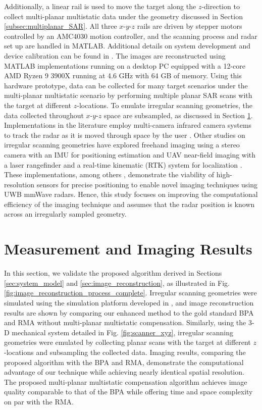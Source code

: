 \documentclass{ieeeaccess}
\begin{document}
Additionally, a linear rail is used to move the target along the $z$-direction to collect multi-planar multistatic data under the geometry discussed in Section \ref{subsec:multiplanar_SAR}.
All three $x$-$y$-$z$ rails are driven by stepper motors controlled by an AMC4030 motion controller, and the scanning process and radar set up are handled in MATLAB.
Additional details on system development and device calibration can be found in \cite{yanik2020development}.
The images are reconstructed using MATLAB implementations running on a desktop PC equipped with a 12-core AMD Ryzen 9 3900X running at 4.6 GHz with 64 GB of memory.
Using this hardware prototype, data can be collected for many target scenarios under the multi-planar multistatic scenario by performing multiple planar SAR scans with the target at different $z$-locations.
To emulate irregular scanning geometries, the data collected throughout $x$-$y$-$z$ space are subsampled, as discussed in Section \ref{sec:results}.
Implementations in the literature employ multi-camera infrared camera systems to track the radar as it is moved through space by the user \cite{alvarez2019freehand,alvarez2021freehand}.
Other studies on irregular scanning geometries have explored freehand imaging using a stereo camera with an IMU for positioning estimation \cite{alvarez2021towards} and UAV near-field imaging with a laser rangefinder and a real-time kinematic (RTK) system for localization \cite{garcia20203DSARProcessing}. 
These implementations, among others \cite{alvarez2021freehandsystem,alvarez2021system,wu2020multilayered,kan2020automotiveSAR}, demonstrate the viability of high-resolution sensors for precise positioning to enable novel imaging techniques using UWB mmWave radars.
Hence, this study focuses on improving the computational efficiency of the imaging technique and assumes that the radar position is known across an irregularly sampled geometry.

\section{Measurement and Imaging Results}
\label{sec:results}
In this section, we validate the proposed algorithm derived in Sections \ref{sec:system_model} and \ref{sec:image_reconstruction}, as illustrated in Fig. \ref{fig:image_reconstruction_process_complete}.
Irregular scanning geometries were simulated using the simulation platform developed in \cite{smith2022ThzToolbox}, and image reconstruction results are shown by comparing our enhanced method to the gold standard BPA and RMA without multi-planar multistatic compensation.
Similarly, using the \mbox{3-D} mechanical system detailed in Fig. \ref{fig:scanner_xyz}, irregular scanning geometries were emulated by collecting planar scans with the target at different $z$-locations and subsampling the collected data.
Imaging results, comparing the proposed algorithm with the BPA and RMA, demonstrate the computational advantage of our technique while achieving nearly identical spatial resolution.
The proposed multi-planar multistatic compensation algorithm achieves image quality comparable to that of the BPA while offering time and space complexity on par with the RMA.
\end{document}
